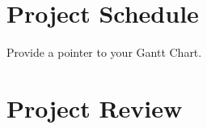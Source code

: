 \documentclass{article}
\begin{document}
\section{Project Schedule}

Provide a pointer to your Gantt Chart.

\section{Project Review}
\end{document}

